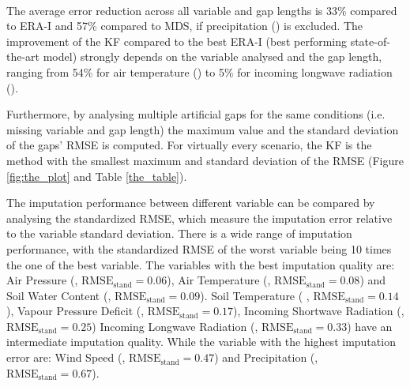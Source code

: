 \documentclass{article}
\begin{document}
\paragraph{}
The average error reduction across all variable and gap lengths is 33\% compared to ERA-I and 57\% compared to MDS, if precipitation () is excluded. The improvement of the KF compared to the best ERA-I (best performing state-of-the-art model) strongly depends on the variable analysed and the gap length, ranging from 54\% for air temperature () to 5\% for incoming longwave radiation ().

Furthermore, by analysing multiple artificial gaps for the same conditions (i.e. missing variable and gap length) the maximum value and the standard deviation of the gaps' RMSE is computed. For virtually every scenario, the KF is the method with the smallest maximum and standard deviation of the RMSE (Figure \ref{fig:the_plot} and Table \ref{the_table}). 

The imputation performance between different variable can be compared by analysing the standardized RMSE, which measure the imputation error relative to the variable standard deviation. There is a wide range of imputation performance, with the standardized RMSE of the worst variable being 10 times the one of the best variable.
The variables with the best imputation quality are:
Air Pressure (, $\text{RMSE}_{\text{stand}} = 0.06$),
Air Temperature (, $\text{RMSE}_{\text{stand}} = 0.08$)
and Soil Water Content (, $\text{RMSE}_{\text{stand}} = 0.09$).
Soil Temperature ( , $\text{RMSE}_{\text{stand}} = 0.14$),
Vapour Pressure Deficit (, $\text{RMSE}_{\text{stand}} = 0.17$),
Incoming Shortwave Radiation (, $\text{RMSE}_{\text{stand}} = 0.25$)
Incoming Longwave Radiation (, $\text{RMSE}_{\text{stand}} = 0.33$)
have an intermediate imputation quality.
While the variable with the highest imputation error are: Wind Speed (, $\text{RMSE}_{\text{stand}} = 0.47$) and  Precipitation (, $\text{RMSE}_{\text{stand}} = 0.67$).





\end{document}
